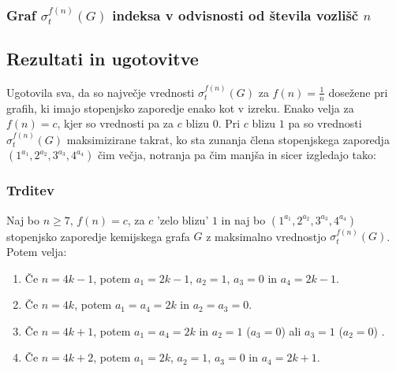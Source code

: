 \documentclass{article}
\begin{document}
\vspace*{1cm}


\subsubsection*{Graf $\sigma_t^{f(n)}(G)$ indeksa v odvisnosti od števila vozlišč $n$}



\subsection*{Rezultati in ugotovitve}
Ugotovila sva, da so največje vrednosti $\sigma_t^{f(n)}(G)$ za $f(n) = \frac{1}{n}$ dosežene 
pri grafih, ki imajo stopenjsko zaporedje enako kot v izreku. Enako velja za $f(n) = c$,
kjer so vrednosti pa za $c$ blizu $0$. Pri $c$ blizu $1$ pa so vrednosti $\sigma_t^{f(n)}(G)$
maksimizirane takrat, ko sta zunanja člena stopenjskega zaporedja $(1^{a_1}, 2^{a_2}, 3^{a_3}, 4^{a_4})$
čim večja, notranja pa čim manjša in sicer izgledajo tako:

\subsubsection*{Trditev}
Naj bo $n \geq 7$, $f(n) = c$, za $c$ 'zelo blizu' $1$ in naj bo $(1^{a_1}, 2^{a_2}, 3^{a_3}, 4^{a_4})$
stopenjsko zaporedje kemijskega grafa $G$ z maksimalno vrednostjo $\sigma_t^{f(n)}(G)$. Potem velja:
\begin{enumerate}
    \item Če $n = 4k - 1$, potem $a_1 = 2k - 1$, $a_2 = 1$, $a_3 = 0$ in $a_4 = 2k - 1$.
    \item Če $n = 4k$, potem $a_1 = a_4 = 2k$ in $a_2 = a_3 = 0$.
    \item Če $n = 4k + 1$, potem $a_1 = a_4 = 2k$ in $a_2 = 1$ ($a_3 = 0$) ali $a_3 = 1$ ($a_2 = 0$) .
    \item Če $n = 4k + 2$, potem $a_1 = 2k$, $a_2 = 1$, $a_3 = 0$ in $a_4 = 2k + 1$. 
\end{enumerate}
\end{document}
